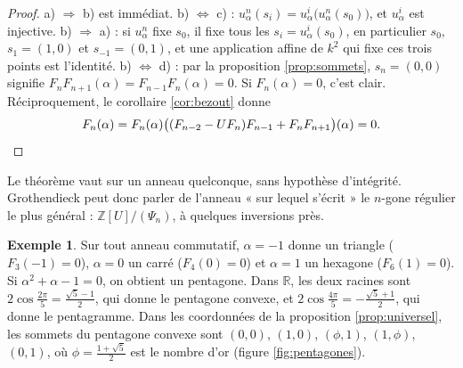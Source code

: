 \documentclass[11pt,a4paper]{article}
\theoremstyle{plain}
\theoremstyle{definition}
\newtheorem{exemple}[theoreme]{Exemple}
\theoremstyle{remark}
\newcommand{\Z}{\mathbb{Z}}
\newcommand{\R}{\mathbb{R}}
\begin{document}
\begin{proof}
a) $\Rightarrow$ b) est immédiat. b) $\Leftrightarrow$ c) : $u_\alpha^n(s_i)=u_\alpha^i\big(u_\alpha^n(s_0)\big)$, et $u_\alpha^i$ est injective. b) $\Rightarrow$ a) : si $u_\alpha^n$ fixe $s_0$, il fixe tous les $s_i=u_\alpha^i(s_0)$, en particulier $s_0$, $s_1=(1,0)$ et $s_{-1}=(0,1)$, et une application affine de $k^2$ qui fixe ces trois points est l'identité. b) $\Leftrightarrow$ d) : par la proposition \ref{prop:sommets}, $s_n=(0,0)$ signifie $F_nF_{n+1}(\alpha)=F_{n-1}F_n(\alpha)=0$. Si $F_n(\alpha)=0$, c'est clair. Réciproquement, le corollaire \ref{cor:bezout} donne
\[
  F_n(\alpha)=F_n(\alpha)\big((F_{n-2}-UF_n)F_{n-1}+F_nF_{n+1}\big)(\alpha)=0 .\qedhere
\]
\end{proof}

Le théorème vaut sur un anneau quelconque, sans hypothèse d'intégrité. Grothendieck peut donc parler de l'anneau « sur lequel s'écrit » le $n$-gone régulier le plus général : $\Z[U]/(\Psi_n)$, à quelques inversions près.

\begin{exemple}\label{ex:petits}
Sur tout anneau commutatif, $\alpha=-1$ donne un triangle ($F_3(-1)=0$), $\alpha=0$ un carré ($F_4(0)=0$) et $\alpha=1$ un hexagone ($F_6(1)=0$). Si $\alpha^2+\alpha-1=0$, on obtient un pentagone. Dans $\R$, les deux racines sont $2\cos\frac{2\pi}5=\frac{\sqrt5-1}2$, qui donne le pentagone convexe, et $2\cos\frac{4\pi}5=-\frac{\sqrt5+1}2$, qui donne le pentagramme. Dans les coordonnées de la proposition \ref{prop:universel}, les sommets du pentagone convexe sont $(0,0)$, $(1,0)$, $(\phi,1)$, $(1,\phi)$, $(0,1)$, où $\phi=\frac{1+\sqrt5}2$ est le nombre d'or (figure \ref{fig:pentagones}).
\end{exemple}
\end{document}
